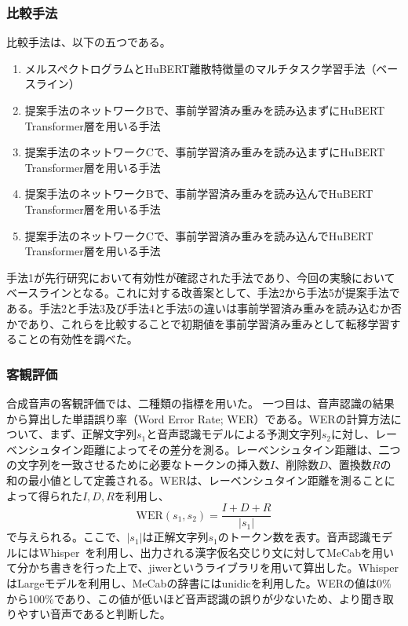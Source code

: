 \documentclass[12pt]{jarticle}
\numberwithin{equation}{section}    %
\numberwithin{figure}{section}      %
\numberwithin{table}{section}      %
\begin{document}
\subsubsection{比較手法}
\label{sec4:subsubsection:methods}
比較手法は、以下の五つである。
\begin{enumerate}
    \item メルスペクトログラムとHuBERT離散特徴量のマルチタスク学習手法（ベースライン）
    \item 提案手法のネットワークBで、事前学習済み重みを読み込まずにHuBERT Transformer層を用いる手法
    \item 提案手法のネットワークCで、事前学習済み重みを読み込まずにHuBERT Transformer層を用いる手法
    \item 提案手法のネットワークBで、事前学習済み重みを読み込んでHuBERT Transformer層を用いる手法
    \item 提案手法のネットワークCで、事前学習済み重みを読み込んでHuBERT Transformer層を用いる手法
\end{enumerate}
手法1が先行研究において有効性が確認された手法であり、今回の実験においてベースラインとなる。これに対する改善案として、手法2から手法5が提案手法である。手法2と手法3及び手法4と手法5の違いは事前学習済み重みを読み込むか否かであり、これらを比較することで初期値を事前学習済み重みとして転移学習することの有効性を調べた。

\subsubsection{客観評価}
合成音声の客観評価では、二種類の指標を用いた。
一つ目は、音声認識の結果から算出した単語誤り率（Word Error Rate; WER）である。WERの計算方法について、まず、正解文字列$s_{1}$と音声認識モデルによる予測文字列$s_{2}$に対し、レーベンシュタイン距離によってその差分を測る。レーベンシュタイン距離は、二つの文字列を一致させるために必要なトークンの挿入数$I$、削除数$D$、置換数$R$の和の最小値として定義される。WERは、レーベンシュタイン距離を測ることによって得られた$I, D, R$を利用し、
\begin{equation}
    \text{WER}(s_{1}, s_{2}) = \frac{I + D + R}{|s_{1}|}
\end{equation}
で与えられる。ここで、$|s_{1}|$は正解文字列$s_{1}$のトークン数を表す。音声認識モデルにはWhisper~\cite{radford2023robust}を利用し、出力される漢字仮名交じり文に対してMeCabを用いて分かち書きを行った上で、jiwerというライブラリを用いて算出した。WhisperはLargeモデルを利用し、MeCabの辞書にはunidicを利用した。WERの値は0\%から100\%であり、この値が低いほど音声認識の誤りが少ないため、より聞き取りやすい音声であると判断した。
\end{document}
